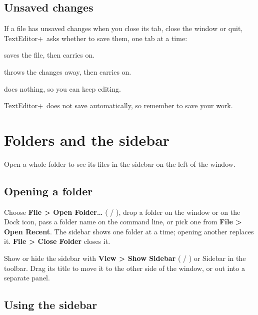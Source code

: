 \documentclass[11pt,a4paper]{article}
\newcommand{\appname}{TextEditor+}
\newcommand{\menu}[1]{\textsf{\textbf{#1}}}
\newcommand{\ui}[1]{\textsf{#1}}
\begin{document}
\subsection{Unsaved changes}\label{sec:unsaved}

If a file has unsaved changes when you close its tab, close the window or
quit, \appname\ asks whether to save them, one tab at a time:

\begin{description}[leftmargin=1.5em]
  \item[\ui{Save}] saves the file, then carries on.
  \item[\ui{Don't Save} / \ui{Discard}] throws the changes away, then carries on.
  \item[\ui{Cancel}] does nothing, so you can keep editing.
\end{description}

\appname\ does not save automatically, so remember to save your work.

\section{Folders and the sidebar}\label{sec:folders}

Open a whole folder to see its files in the sidebar on the left of the window.

\subsection{Opening a folder}

Choose \menu{File > Open Folder…} ( / ), drop a folder on
the window or on the Dock icon, pass a folder name on the command line, or pick
one from \menu{File > Open Recent}. The sidebar shows one folder at a time;
opening another replaces it. \menu{File > Close Folder} closes it.

Show or hide the sidebar with \menu{View > Show Sidebar} (
/ ) or \ui{Sidebar} in the toolbar. Drag its title
to move it to the other side of the window, or out into a separate panel.

\subsection{Using the sidebar}
\end{document}
